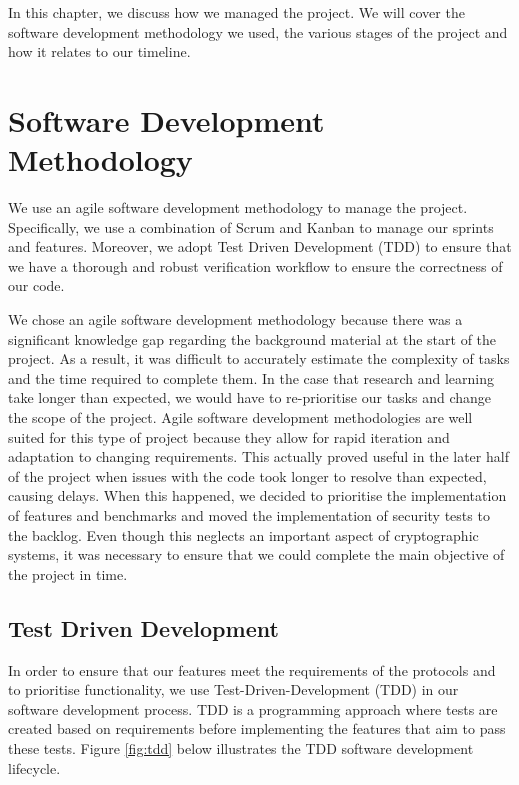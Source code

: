 In this chapter, we discuss how we managed the project. We will cover the software development 
methodology we used, the various stages of the project and how it relates to our timeline.
\section{Software Development Methodology}
We use an agile software development methodology to manage the project. Specifically, we use 
a combination of Scrum and Kanban to manage our sprints and features. Moreover, we adopt 
Test Driven Development (TDD) to ensure that we have a thorough and robust verification 
workflow to ensure the correctness of our code. 

We chose an agile software development 
methodology because there was a significant knowledge gap regarding the background material 
at the start of the project. As a result, it was difficult to accurately estimate the 
complexity of tasks and the time required to complete them. In the case that research and 
learning take longer than expected, we would have to re-prioritise our tasks and change 
the scope of the project. 
Agile software development methodologies are well suited for this type of project because 
they allow for rapid iteration and adaptation to changing requirements. This actually 
proved useful in the later half of the project when issues with the code took longer to 
resolve than expected, causing delays. When this happened, we decided to prioritise 
the implementation of features and benchmarks and moved the implementation of security 
tests to the backlog. Even though this neglects an important aspect of cryptographic 
systems, it was necessary to ensure that we could complete the main objective of the 
project in time.

\subsection{Test Driven Development}
In order to ensure that our features meet the requirements of the protocols and to prioritise functionality, we use Test-Driven-Development (TDD) in our software development process. TDD is a programming approach where tests are created based on requirements before implementing the features that aim to pass these tests. Figure \ref{fig:tdd} below illustrates the TDD software development lifecycle.

